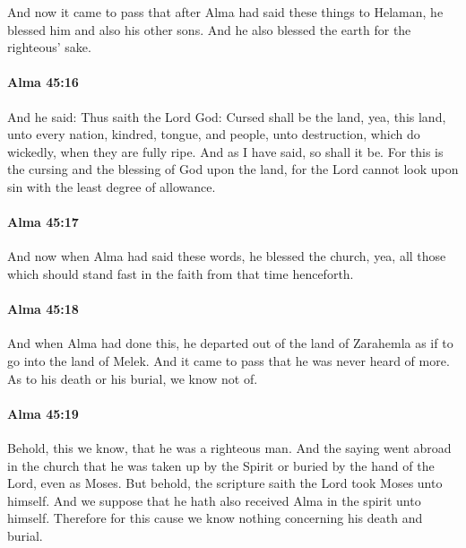 			And now it came to pass that
			after Alma had said these things to Helaman,
			he blessed him and also his other sons.
			And he also blessed the earth for the righteous' sake.

		\paragraph{Alma 45:16} %
			\label{ALMA-45-16}

			And he said:
			Thus saith the Lord God:
			Cursed shall be the land, yea, this land,
			unto every nation, kindred, tongue, and people,
			unto destruction, which do wickedly, when they are fully ripe.
			And as I have said, so shall it be.
			For this is the cursing and the blessing of God upon the land,
			for the Lord cannot look upon sin with the least degree of allowance.

		\paragraph{Alma 45:17} %
			\label{ALMA-45-17}

			And now when Alma had said these words, he blessed the church,
			yea, all those which should stand fast in the faith from that time henceforth.

		\paragraph{Alma 45:18} %
			\label{ALMA-45-18}

			And when Alma had done this, he departed out of the land of Zarahemla
			as if to go into the land of Melek.
			And it came to pass that he was never heard of more.
			As to his death or his burial, we know not of.

		\paragraph{Alma 45:19} %
			\label{ALMA-45-19}

			Behold, this we know, that he was a righteous man.
			And the saying went abroad in the church
			that he was taken up by the Spirit
			or buried by the hand of the Lord, even as Moses.
			But behold, the scripture saith the Lord took Moses unto himself.
			And we suppose that he hath also received Alma in the spirit unto himself.
			Therefore for this cause we know nothing concerning his death and burial.

